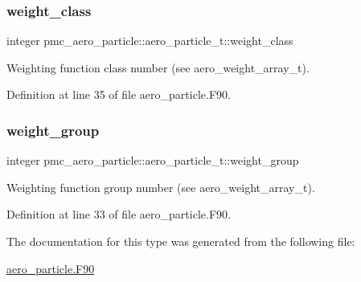 \subsubsection{\texorpdfstring{weight\+\_\+class}{weight\_class}}
{\footnotesize\ttfamily integer pmc\+\_\+aero\+\_\+particle\+::aero\+\_\+particle\+\_\+t\+::weight\+\_\+class}



Weighting function class number (see {\ttfamily aero\+\_\+weight\+\_\+array\+\_\+t}). 



Definition at line 35 of file aero\+\_\+particle.\+F90.

\mbox{\label{structpmc__aero__particle_1_1aero__particle__t_a6b670aeae68fba7b99128b0a4d8cafb5}} 
\subsubsection{\texorpdfstring{weight\+\_\+group}{weight\_group}}
{\footnotesize\ttfamily integer pmc\+\_\+aero\+\_\+particle\+::aero\+\_\+particle\+\_\+t\+::weight\+\_\+group}



Weighting function group number (see {\ttfamily aero\+\_\+weight\+\_\+array\+\_\+t}). 



Definition at line 33 of file aero\+\_\+particle.\+F90.



The documentation for this type was generated from the following file\+:\begin{DoxyCompactItemize}
\item 
\mbox{\hyperlink{aero__particle_8_f90}{aero\+\_\+particle.\+F90}}\end{DoxyCompactItemize}
